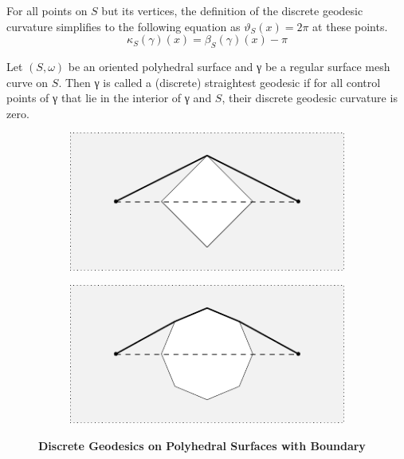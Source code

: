 \documentclass{stdlocal}
\begin{document}
  For all points on $S$ but its vertices, the definition of the discrete geodesic curvature simplifies to the following equation as $ϑ_S(x) = 2π$ at these points.
  \[
    κ_S(γ)(x) = β_S(γ)(x) - π
  \]

  \begin{definition}
    Let $(S,ω)$ be an oriented polyhedral surface and γ be a regular surface mesh curve on $S$.
    Then γ is called a (discrete) straightest geodesic if for all control points of γ that lie in the interior of γ and $S$, their discrete geodesic curvature is zero.
  \end{definition}

  \begin{figure}
    \centering
    \begin{subfigure}[b]{0.49\linewidth}
      \centering
      \includegraphics[width=\linewidth]{figures/geodesic-on-boundary-discrete-1.pdf}
    \end{subfigure}
    \hfill
    \begin{subfigure}[b]{0.49\linewidth}
      \centering
      \includegraphics[width=\linewidth]{figures/geodesic-on-boundary-discrete-2.pdf}
    \end{subfigure}
    \caption[Discrete Geodesics on Polyhedral Surfaces with Boundary]{%
      \textbf{Discrete Geodesics on Polyhedral Surfaces with Boundary}\\
    }
    \label{fig:discrete-geodesics-on-boundary}
  \end{figure}





\end{document}
